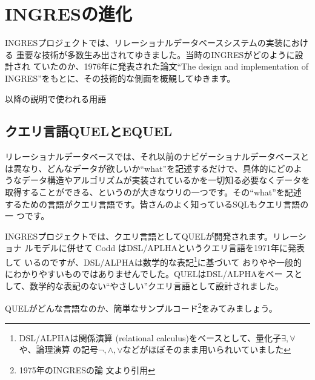 \section{INGRESの進化}


INGRESプロジェクトでは、リレーショナルデータベースシステムの実装における
重要な技術が多数生み出されてゆきました。当時のINGRESがどのように設計され
ていたのか、1976年に発表された論文``The design and implementation of
INGRES''をもとに、その技術的な側面を概観してゆきます。


\begin{center}
 \begin{minipage}{0.95\textwidth}
  \begin{screen}
   以降の説明で使われる用語


   \footnotesize




  \end{screen}
 \end{minipage}
\end{center}


\subsection{クエリ言語QUELとEQUEL}


リレーショナルデータベースでは、それ以前のナビゲーショナルデータベースと
は異なり、どんなデータが欲しいか``what''を記述するだけで、具体的にどのよ
うなデータ構造やアルゴリズムが実装されているかを一切知る必要なくデータを
取得することができる、というのが大きなウリの一つです。その``what''を記述
するための言語がクエリ言語です。皆さんのよく知っているSQLもクエリ言語の一
つです。


INGRESプロジェクトでは、クエリ言語としてQUELが開発されます。リレーショナ
ルモデルに併せて Codd はDSL/APLHAというクエリ言語を1971年に発表して
いるのですが、DSL/ALPHAは数学的な表記\footnote{DSL/ALPHAは関係演算
(relational calculus)をベースとして、量化子$\exists, \forall$や、論理演算
の記号$\lnot,\land,\lor$などがほぼそのまま用いられいていました}に基づいて
おりやや一般的にわかりやすいものではありませんでした。QUELはDSL/ALPHAをベー
スとして、数学的な表記のない``やさしい''クエリ言語として設計されました。


QUELがどんな言語なのか、簡単なサンプルコード\footnote{1975年のINGRESの論
文より引用}をみてみましょう。

